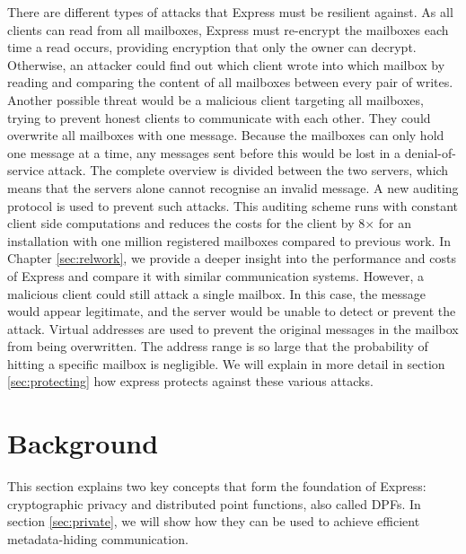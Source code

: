 \documentclass[a4paper]{article}
\begin{document}
There are different types of attacks that Express must be resilient against.
As all clients can read from all mailboxes, Express must re-encrypt the mailboxes each time a read occurs, providing encryption that only the owner can decrypt. Otherwise, an attacker could find out which client wrote into which mailbox by reading and comparing the content of all mailboxes between every pair of writes. Another possible threat would be a malicious client targeting all mailboxes, trying to prevent honest clients to communicate with each other. They could overwrite all mailboxes with one message. Because the mailboxes can only hold one message at a time, any messages sent before this would be lost in a denial-of-service attack. The complete overview is divided between the two servers, which means that the servers alone cannot recognise an invalid message. A new auditing protocol is used to prevent such attacks. This auditing scheme runs with constant client side computations and reduces the costs for the client by 8$\times$ for an installation with one million registered mailboxes compared to previous work. In Chapter \ref{sec:relwork}, we provide a deeper insight into the performance and costs of Express and compare it with similar communication systems. However, a malicious client could still attack a single mailbox. In this case, the message would appear legitimate, and the server would be unable to detect or prevent the attack. Virtual addresses are used to prevent the original messages in the mailbox from being overwritten. The address range is so large that the probability of hitting a specific mailbox is negligible. We will explain in more detail in section \ref{sec:protecting} how express protects against these various attacks.

\section{Background}
\label{sec:background}
This section explains two key concepts that form the foundation of Express: cryptographic privacy and distributed point functions, also called DPFs. In section \ref{sec:private}, we will show how they can be used to achieve efficient metadata-hiding communication.
\end{document}
